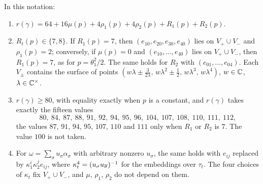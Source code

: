 \begin{theorem}
\label{thm:quarticrank}
In this notation:
\begin{enumerate}[label=\textup{(\roman*)},leftmargin=2.6em,itemsep=2pt]
\item $r(\gamma)=64+16\mu(p)+4\rho_{1}(p)+4\rho_{2}(p)+R_{1}(p)+R_{2}(p)$.
\item $R_{t}(p)\in\{7,8\}$. If $R_{1}(p)=7$, then
  $(e_{10},e_{20},e_{30},e_{40})$ lies on $V_{+}\cup V_{-}$ and
  $\rho_{1}(p)=2$; conversely, if $\mu(p)=0$ and
  $(e_{10},\dots,e_{40})$ lies on $V_{+}\cup V_{-}$, then $R_{1}(p)=7$, as for
  $p=\theta_{1}^{2}/2$. The same holds for $R_{2}$ with
  $(e_{01},\dots,e_{04})$. Each $V_{\pm}$ contains the surface of points
  $(w\lambda\pm\frac{3}{2\lambda},\,w\lambda^{2}\pm\frac12,\,w\lambda^{3},
  \,w\lambda^{4})$, $w\in\mathbb{C}$, $\lambda\in\mathbb{C}^{\times}$.
\item $r(\gamma)\ge80$, with equality exactly when $p$ is a constant, and
  $r(\gamma)$ takes exactly the fifteen values
  \[
    80,\ 84,\ 87,\ 88,\ 91,\ 92,\ 94,\ 95,\ 96,\ 104,\ 107,\ 108,\ 110,\ 111,\
    112 ,
  \]
  the values $87$, $91$, $94$, $95$, $107$, $110$ and $111$ only when $R_{1}$
  or $R_{2}$ is $7$. The value $100$ is not taken.
\item For $\omega=\sum_{\sigma}u_{\sigma}\alpha_{\sigma}$ with arbitrary
  nonzero $u_{\sigma}$, the same holds with $e_{ij}$ replaced by
  $\kappa_{1}^{i}\kappa_{2}^{j}e_{ij}$, where $\kappa_{t}^{4}=
  (u_{\sigma}u_{\overline{\sigma}})^{-1}$ for the embeddings over $\tau_{t}$. The
  four choices of $\kappa_{t}$ fix $V_{+}\cup V_{-}$, and $\mu$, $\rho_{1}$,
  $\rho_{2}$ do not depend on them.
\end{enumerate}
\end{theorem}

